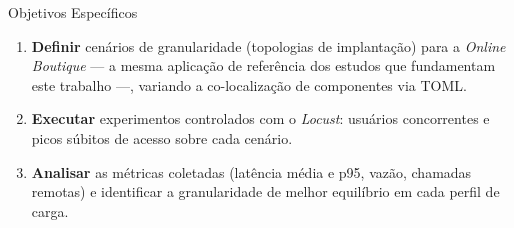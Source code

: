 \begin{frame}{Objetivos Específicos}
    \begin{enumerate}
        \item \textbf{Definir} cenários de granularidade (topologias de implantação) para a \textit{Online Boutique} \cite{mendonca2024serviceweaver, rego2025granularity} --- a mesma aplicação de referência dos estudos que fundamentam este trabalho ---, variando a co-localização de componentes via TOML.
        \item \textbf{Executar} experimentos controlados com o \textit{Locust}: usuários concorrentes e picos súbitos de acesso sobre cada cenário.
        \item \textbf{Analisar} as métricas coletadas (latência média e p95, vazão, chamadas remotas) e identificar a granularidade de melhor equilíbrio em cada perfil de carga.
    \end{enumerate}
\end{frame}
